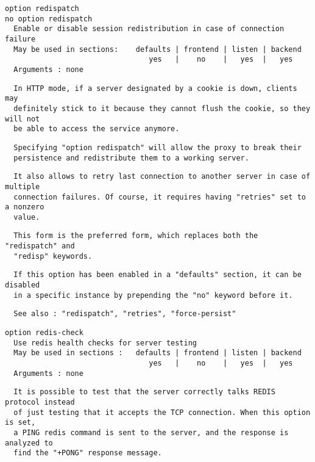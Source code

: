 \begin{verbatim}
option redispatch
no option redispatch
  Enable or disable session redistribution in case of connection failure
  May be used in sections:    defaults | frontend | listen | backend
                                 yes   |    no    |   yes  |   yes
  Arguments : none
\end{verbatim}

\begin{verbatim}
  In HTTP mode, if a server designated by a cookie is down, clients may
  definitely stick to it because they cannot flush the cookie, so they will not
  be able to access the service anymore.
\end{verbatim}

\begin{verbatim}
  Specifying "option redispatch" will allow the proxy to break their
  persistence and redistribute them to a working server.
\end{verbatim}

\begin{verbatim}
  It also allows to retry last connection to another server in case of multiple
  connection failures. Of course, it requires having "retries" set to a nonzero
  value.
\end{verbatim}

\begin{verbatim}
  This form is the preferred form, which replaces both the "redispatch" and
  "redisp" keywords.
\end{verbatim}

\begin{verbatim}
  If this option has been enabled in a "defaults" section, it can be disabled
  in a specific instance by prepending the "no" keyword before it.
\end{verbatim}

\begin{verbatim}
  See also : "redispatch", "retries", "force-persist"
\end{verbatim}

\begin{verbatim}
option redis-check
  Use redis health checks for server testing
  May be used in sections :   defaults | frontend | listen | backend
                                 yes   |    no    |   yes  |   yes
  Arguments : none
\end{verbatim}

\begin{verbatim}
  It is possible to test that the server correctly talks REDIS protocol instead
  of just testing that it accepts the TCP connection. When this option is set,
  a PING redis command is sent to the server, and the response is analyzed to
  find the "+PONG" response message.
\end{verbatim}


